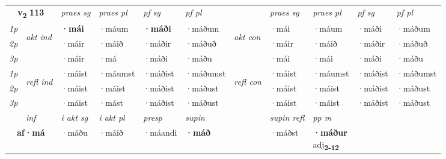 \noindent
\begin{tabular}{lllllllllll} \toprule
\multicolumn{2}{c}{\textbf{v{\textsubscript{2}}} \Large{\textbf{113}}}  &  \textit{praes sg}  & \textit{praes pl}  &\textit{ pf sg} & \textit{pf pl} &  &  \textit{praes sg}  & \textit{praes pl}  & \textit{pf sg} & \textit{pf pl } \\*
	\cmidrule{3-6} \cmidrule{8-11}
 {\textit{1p}} & \multirow{3}{*}{\begin{turn}{90}\textit{akt ind}\end{turn}} & \textbf{·mái} & ·máum & \textbf{·máði} & ·máðum & \multirow{3}{*}{\begin{turn}{90}\textit{akt con}\end{turn}} &·mái & ·máum & ·máði & ·máðum\\*
 {\textit{2p}} &  &  ·máir  & ·máið & ·máðir & ·máðuð & & ·máir & ·máið & ·máðir & ·máðuð \\*
{\textit{3p}} &  & ·máir & ·má & ·máði & ·máðu & & ·mái & ·mái& ·máði & ·máðu \\*
\cmidrule{3-6} \cmidrule{8-11}
 {\textit{1p}} & \multirow{3}{*}{\begin{turn}{90}\textit{refl ind}\end{turn}}  & ·máist & ·máumst & ·máðist & ·máðumst & \multirow{3}{*}{\begin{turn}{90}\textit{refl con}\end{turn}}  &·máist & ·máumst & ·máðist & ·máðumst \\*
 {\textit{2p}} &  & ·máist & ·máist & ·máðist & ·máðust & &·máist & ·máist & ·máðist & ·máðust \\*
 {\textit{3p}}  & & ·máist & ·mást & ·máðist & ·máðust & & ·máist & ·máist& ·máðist & ·máðust \\*
\cmidrule{3-6} \cmidrule{8-11}

   \multicolumn{2}{c}{\textit{inf}}  & \textit{i akt sg} & \textit{i akt pl}   & \textit{presp} & \textit{supin} && \textit{supin refl} & \textit{pp m} \\*
  \multicolumn{2}{c}{\textbf{af\allowbreak ·má}} & ·máðu  & ·máið   & ·máandi &  \textbf{·máð} && ·máðst & \specialcell{\textbf{·máður} \\ adj\textbf{\textsubscript{2-12}}} \\*
\end{tabular}

